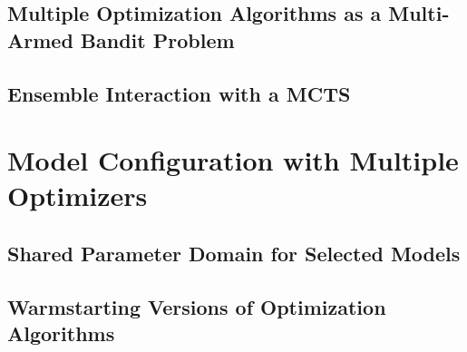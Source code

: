 \Blindtext

\subsection{Multiple Optimization Algorithms as a Multi-Armed Bandit Problem}
\label{sec:appraoch:selection:bandit}

\Blindtext

\subsection{Ensemble Interaction with a MCTS}
\label{sec:appraoch:selection:mcts}

\Blindtext

\section{Model Configuration with Multiple Optimizers}
\label{sec:approach:configuration}

\Blindtext

\subsection{Shared Parameter Domain for Selected Models}
\label{sec:appraoch:configuration:parameter}

\Blindtext

\subsection{Warmstarting Versions of Optimization Algorithms}
\label{sec:appraoch:configuration:warmstart}

\Blindtext